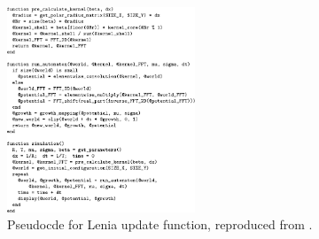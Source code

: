 \begin{figure}
\centering
\includegraphics[width=0.5\textwidth]{img/lenia-pseudocode}
\caption{Pseudocde for Lenia update function, reproduced from \citep{chan2019lenia}.}
\label{fig:lenia-event-types}
\end{figure}
